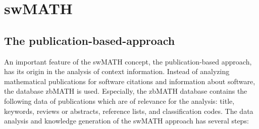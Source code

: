 \documentclass[12pt]{article}
\begin{document}
\section{swMATH}
\subsection{The publication-based-approach}
An important feature of the swMATH \cite{swMATH} concept, the publication-based approach, has its origin in the analysis of context information. Instead of analyzing  mathematical publications for software citations and information about software, the database zbMATH \cite{zbMATH} is used.  Especially, the zbMATH database contains the following data of publications which are of relevance for the analysis: title, keywords, reviews or abstracts, reference lists, and classification codes.
The data analysis and knowledge generation of the swMATH approach has several steps:
\end{document}
